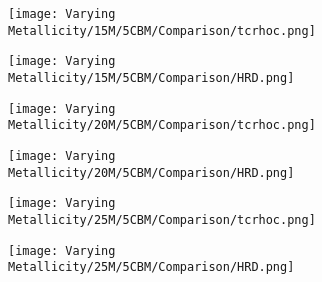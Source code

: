 \begin{figure}[htbp]
    \centering
    \begin{minipage}{\textwidth}
        \centering
        \begin{subfigure}{0.49\textwidth}
            \texttt{[image: Varying Metallicity/15M/5CBM/Comparison/tcrhoc.png]}
        \end{subfigure}%
        \hfill
        \begin{subfigure}{0.49\textwidth}
            \texttt{[image: Varying Metallicity/15M/5CBM/Comparison/HRD.png]}
        \end{subfigure}
        \label{fig:15M-5CBM}
    \end{minipage}
    
    \vspace{1em}
    
    \begin{minipage}{\textwidth}
        \centering
        \begin{subfigure}{0.49\textwidth}
            \texttt{[image: Varying Metallicity/20M/5CBM/Comparison/tcrhoc.png]}
        \end{subfigure}%
        \hfill
        \begin{subfigure}{0.49\textwidth}
            \texttt{[image: Varying Metallicity/20M/5CBM/Comparison/HRD.png]}
        \end{subfigure}
        \label{fig:20M-5CBM}
    \end{minipage}
    
    \vspace{1em}

    \begin{minipage}{\textwidth}
        \centering
        \begin{subfigure}{0.49\textwidth}
            \texttt{[image: Varying Metallicity/25M/5CBM/Comparison/tcrhoc.png]}
        \end{subfigure}%
        \hfill
        \begin{subfigure}{0.49\textwidth}
            \texttt{[image: Varying Metallicity/25M/5CBM/Comparison/HRD.png]}
        \end{subfigure}
        \label{fig:25M-5CBM}
    \end{minipage}
\end{figure}



